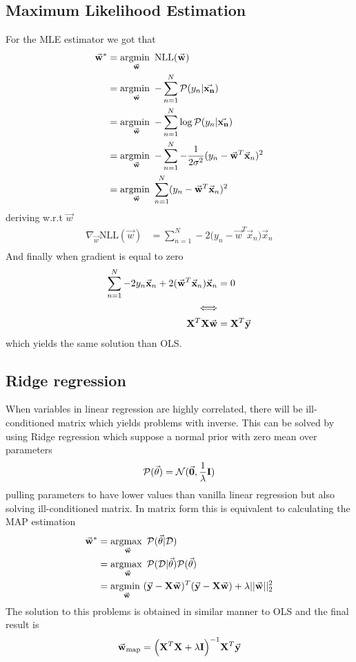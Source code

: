 \documentclass[../../main.tex]{subfiles}
\begin{document}
\subsection{Maximum Likelihood Estimation}
For the MLE estimator we got that
\begin{align*}
    \vec{w}^* &=
    \argmin_{\vec{w}} \text{NLL}(\vec{w})\\
    &= \argmin_{\vec{w}} -\sum_{n=1}^N \p(y_n|\vec{x_n})\\
    &= \argmin_{\vec{w}} -\sum_{n=1}^N \log\p(y_n|\vec{x_n})\\
    &= \argmin_{\vec{w}} -\sum_{n=1}^N -\frac{1}{2\sigma^2}(y_n-\vec{w}^T\vec{x}_n)^2\\
    &= \argmin_{\vec{w}} \sum_{n=1}^N (y_n-\vec{w}^T\vec{x}_n)^2\\
\end{align*}
deriving w.r.t $\vec{w}$
\begin{align*}
    \nabla_{\vec{w}}\text{NLL}(\vec{w})
    &=\sum_{n=1}^N -2\big(y_n-\vec{w}^T\vec{x}_n\big)\vec{x}_n\\
\end{align*}
And finally when gradient is equal to zero
\begin{align*}
    \sum_{n=1}^N -2y_n\vec{x}_n + 2(\vec{w}^T\vec{x}_n)\vec{x}_n &= 0\\
    \Longleftrightarrow & \\
    \mat{X}^T\mat{X}\vec{w} &= \mat{X}^T\vec{y}\\
\end{align*}
which yields the same solution than OLS.

\subsection{Ridge regression}
When variables in linear regression are highly correlated, there will be ill-conditioned matrix which yields problems with inverse. This can be solved by using Ridge regression which suppose a normal prior with zero mean over parameters
\begin{equation*}
    \p(\vec{\theta}) = \normal(\vec{0},\frac{1}{\lambda}\mat{I})
\end{equation*}
pulling parameters to have lower values than vanilla linear regression but also solving ill-conditioned matrix. In matrix form this is equivalent to calculating the MAP estimation
\begin{align*}
    \vec{w}^*
    &= \argmax_{\vec{w}} \p(\vec{\theta}|\D)\\
    &= \argmax_{\vec{w}} \p(\D|\vec{\theta}) \p(\vec{\theta})\\
    &= \argmin_{\vec{w}} (\vec{y}-\mat{X}\vec{w})^T(\vec{y}-\mat{X}\vec{w}) + \lambda||\vec{w}||_2^2
\end{align*}
The solution to this problems is obtained in similar manner to OLS and the final result is
\begin{equation*}
    \vec{w}_{\text{map}} = \Big(\mat{X}^T\mat{X} + \lambda\mat{I}\Big)^{-1}\mat{X}^T\vec{y}
\end{equation*}
\end{document}
